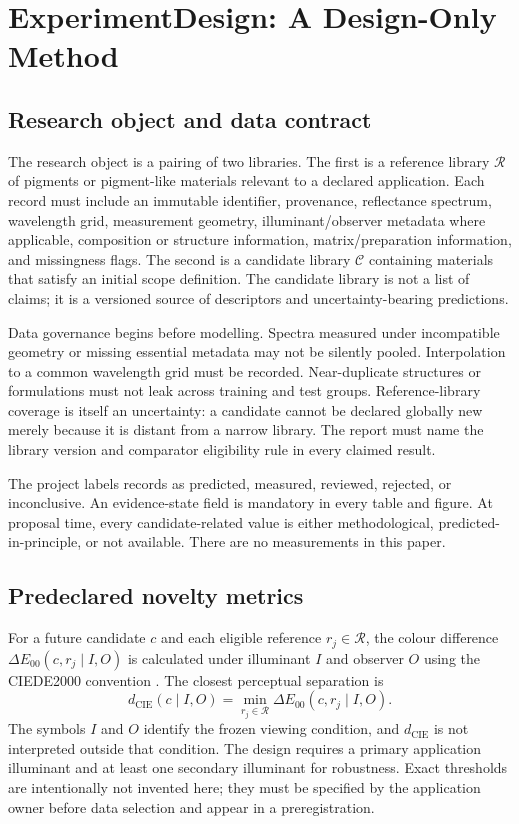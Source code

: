 \documentclass[conference]{IEEEtran}
\begin{document}
\section{ExperimentDesign: A Design-Only Method}

\subsection{Research object and data contract}

The research object is a pairing of two libraries. The first is a reference library $\mathcal{R}$ of pigments or pigment-like materials relevant to a declared application. Each record must include an immutable identifier, provenance, reflectance spectrum, wavelength grid, measurement geometry, illuminant/observer metadata where applicable, composition or structure information, matrix/preparation information, and missingness flags. The second is a candidate library $\mathcal{C}$ containing materials that satisfy an initial scope definition. The candidate library is not a list of claims; it is a versioned source of descriptors and uncertainty-bearing predictions.

Data governance begins before modelling. Spectra measured under incompatible geometry or missing essential metadata may not be silently pooled. Interpolation to a common wavelength grid must be recorded. Near-duplicate structures or formulations must not leak across training and test groups. Reference-library coverage is itself an uncertainty: a candidate cannot be declared globally new merely because it is distant from a narrow library. The report must name the library version and comparator eligibility rule in every claimed result.

The project labels records as predicted, measured, reviewed, rejected, or inconclusive. An evidence-state field is mandatory in every table and figure. At proposal time, every candidate-related value is either methodological, predicted-in-principle, or not available. There are no measurements in this paper.

\subsection{Predeclared novelty metrics}

For a future candidate $c$ and each eligible reference $r_j\in\mathcal{R}$, the colour difference $\Delta E_{00}(c,r_j\mid I,O)$ is calculated under illuminant $I$ and observer $O$ using the CIEDE2000 convention \cite{cie2000}. The closest perceptual separation is
\begin{equation}
d_{\mathrm{CIE}}(c\mid I,O)=\min_{r_j\in\mathcal{R}}\Delta E_{00}(c,r_j\mid I,O).
\label{eq:cie-distance}
\end{equation}
The symbols $I$ and $O$ identify the frozen viewing condition, and $d_{\mathrm{CIE}}$ is not interpreted outside that condition. The design requires a primary application illuminant and at least one secondary illuminant for robustness. Exact thresholds are intentionally not invented here; they must be specified by the application owner before data selection and appear in a preregistration.
\end{document}
